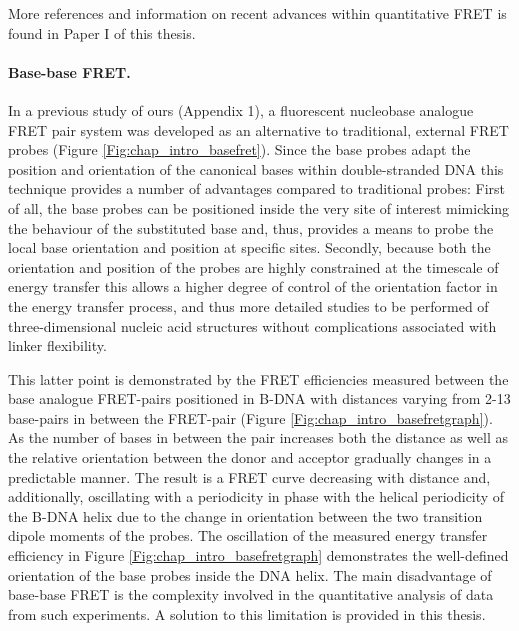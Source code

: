  More references and information on recent advances within quantitative FRET is found in Paper I of this thesis.

 \paragraph{Base-base FRET.} In a previous study of ours (Appendix 1), a fluorescent nucleobase analogue FRET pair system was developed as an alternative to traditional, external FRET probes (Figure \ref{Fig:chap_intro_basefret}).\cite{Borjesson2009a} Since the base probes adapt the position and orientation of the canonical bases within double-stranded DNA this technique provides a number of advantages compared to traditional probes: First of all, the base probes can be positioned inside the very site of interest mimicking the behaviour of the substituted base and, thus, provides a means to probe the local base orientation and position at specific sites. Secondly, because both the orientation and position of the probes are highly constrained at the timescale of energy transfer this allows a higher degree of control of the orientation factor in the energy transfer process, and thus more detailed studies to be performed of three-dimensional nucleic acid structures without complications associated with linker flexibility.

 This latter point is demonstrated by the FRET efficiencies measured between the base analogue FRET-pairs positioned in B-DNA with distances varying from 2-13 base-pairs in between the FRET-pair (Figure \ref{Fig:chap_intro_basefretgraph}).\cite{Borjesson2009a} As the number of bases in between the pair increases both the distance as well as the relative orientation between the donor and acceptor gradually changes in a predictable manner. The result is a FRET curve decreasing with distance and, additionally, oscillating with a periodicity in phase with the helical periodicity of the B-DNA helix due to the change in orientation between the two transition dipole moments of the probes. The oscillation of the measured energy transfer efficiency in Figure \ref{Fig:chap_intro_basefretgraph} demonstrates the well-defined orientation of the base probes inside the DNA helix. The main disadvantage of base-base FRET is the complexity involved in the quantitative analysis of data from such experiments. A solution to this limitation is provided in this thesis.

